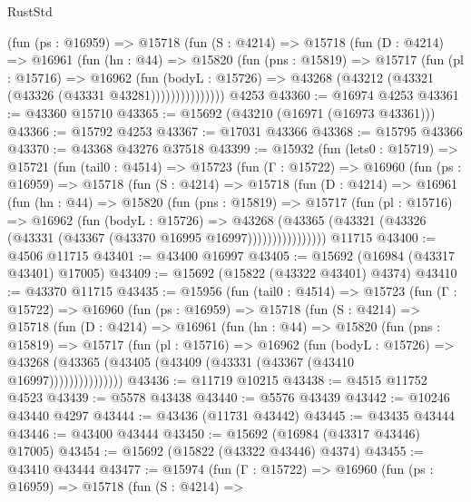 \begin{lexlean}{RustStd}
\begin{coremodule}
            (fun (ps : @16959) =>
            @15718
              (fun (S : @4214) =>
              @15718
                (fun (D : @4214) =>
                @16961
                  (fun (hn : @44) =>
                  @15820
                    (fun (pns : @15819) =>
                    @15717
                      (fun (pl : @15716) =>
                      @16962
                        (fun (bodyL : @15726) =>
                        @43268 (@43212 (@43321 (@43326 (@43331 @43281)))))))))))))))
    @4253
@43360 := @16974 @4253
@43361 := @43360 @15710
@43365 := @15692 (@43210 (@16971 (@16973 @43361)))
@43366 := @15792 @4253
@43367 := @17031 @43366
@43368 := @15795 @43366
@43370 := @43368 @43276 @37518
@43399 := @15932
    (fun (lets0 : @15719) =>
    @15721
      (fun (tail0 : @4514) =>
      @15723
        (fun (Γ : @15722) =>
        @16960
          (fun (ps : @16959) =>
          @15718
            (fun (S : @4214) =>
            @15718
              (fun (D : @4214) =>
              @16961
                (fun (hn : @44) =>
                @15820
                  (fun (pns : @15819) =>
                  @15717
                    (fun (pl : @15716) =>
                    @16962
                      (fun (bodyL : @15726) =>
                      @43268
                        (@43365
                          (@43321 (@43326 (@43331 (@43367 (@43370 @16995 @16997))))))))))))))))
    @11715
@43400 := @4506 @11715
@43401 := @43400 @16997
@43405 := @15692 (@16984 (@43317 @43401) @17005)
@43409 := @15692 (@15822 (@43322 @43401) @4374)
@43410 := @43370 @11715
@43435 := @15956
    (fun (tail0 : @4514) =>
    @15723
      (fun (Γ : @15722) =>
      @16960
        (fun (ps : @16959) =>
        @15718
          (fun (S : @4214) =>
          @15718
            (fun (D : @4214) =>
            @16961
              (fun (hn : @44) =>
              @15820
                (fun (pns : @15819) =>
                @15717
                  (fun (pl : @15716) =>
                  @16962
                    (fun (bodyL : @15726) =>
                    @43268 (@43365 (@43405 (@43409 (@43331 (@43367 (@43410 @16997)))))))))))))))
@43436 := @11719 @10215
@43438 := @4515 @11752 @4523
@43439 := @5578 @43438
@43440 := @5576 @43439
@43442 := @10246 @43440 @4297
@43444 := @43436 (@11731 @43442)
@43445 := @43435 @43444
@43446 := @43400 @43444
@43450 := @15692 (@16984 (@43317 @43446) @17005)
@43454 := @15692 (@15822 (@43322 @43446) @4374)
@43455 := @43410 @43444
@43477 := @15974
    (fun (Γ : @15722) =>
    @16960
      (fun (ps : @16959) =>
      @15718
        (fun (S : @4214) =>

\end{coremodule}
\end{lexlean}
